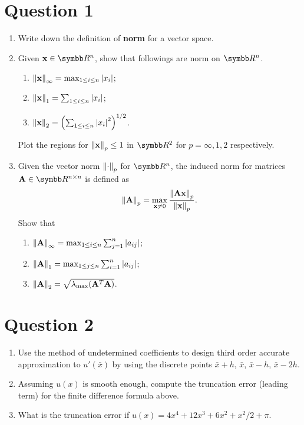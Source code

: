 \section{Question 1}
\begin{enumerate}[label=(\alph*)]
    \item Write down the definition of \textbf{norm} for a vector space.
    \item Given $\vx\in\RR^n$, show that followings are norm on $\RR^n$.
        \begin{enumerate}[label=\roman*.]
            \item $\norm{\vb{x}}_\infty=\max_{1\leq i\leq n}\abs{x_i}$;
            \item $\norm{\vb{x}}_1=\sum_{1\leq i\leq n}\abs{x_i}$;
            \item $\norm{\vb{x}}_2=\qty(\sum_{1\leq i\leq n}\abs{x_i}^2)^{1/2}$.
        \end{enumerate}
        Plot the regions for $\norm{\vb{x}}_p\leq 1$ in $\RR^2$ for $p=\infty,1,2$ respectively.
    \item Given the vector norm $\norm{\cdot}_p$ for $\RR^n$, the induced norm for matrices $\mA\in\RR^{n\times n}$ is defined as
        \[
            \norm{\vb{A}}_p = \max_{\vb{x}\neq 0}\frac{\norm{\vb{A}\vb{x}}_p}{\norm{\vb{x}}_p}.
        \]
        Show that
        \begin{enumerate}[label=\roman*.]
            \item $\norm{\vb{A}}_\infty=\max_{1\leq i\leq n}\sum_{j=1}^n\abs{a_{ij}}$;
            \item $\norm{\vb{A}}_1=\max_{1\leq j\leq n}\sum_{i=1}^n\abs{a_{ij}}$;
            \item $\norm{\vb{A}}_2=\sqrt{\lambda_{\max}\qty(\vb{A}^T\vb{A})}$.
        \end{enumerate}
\end{enumerate}



\section{Question 2}
\begin{enumerate}[label=(\alph*)]
    \item Use the method of undetermined coefficients to design third order accurate approximation to $u'(\bar{x})$ by using the discrete points $\bar{x}+h$, $\bar{x}$, $\bar{x}-h$, $\bar{x}-2h$.
    \item Assuming $u(x)$ is smooth enough, compute the truncation error (leading term) for the finite difference formula above.
    \item What is the truncation error if $u(x) = 4x^4 + 12x^3 + 6x^2 + x^2/2 + \pi$.
\end{enumerate}



